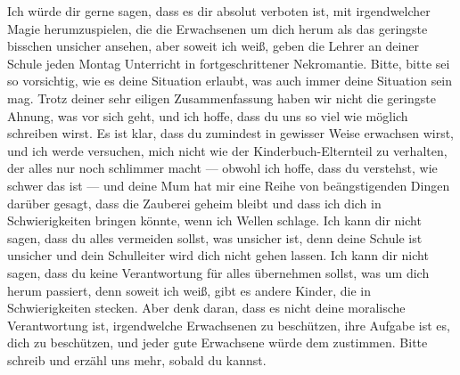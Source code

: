\begin{writtenNote}
Ich würde dir gerne sagen, dass es dir absolut verboten ist, mit irgendwelcher Magie herumzuspielen, die die Erwachsenen um dich herum als das geringste bisschen unsicher ansehen, aber soweit ich weiß, geben die Lehrer an deiner Schule jeden Montag Unterricht in fortgeschrittener Nekromantie. Bitte, bitte sei so vorsichtig, wie es deine Situation erlaubt, was auch immer deine Situation sein mag. Trotz deiner sehr eiligen Zusammenfassung haben wir nicht die geringste Ahnung, was vor sich geht, und ich hoffe, dass du uns so viel wie möglich schreiben wirst. Es ist klar, dass du zumindest in gewisser Weise erwachsen wirst, und ich werde versuchen, mich nicht wie der Kinderbuch-Elternteil zu verhalten, der alles nur noch schlimmer macht — obwohl ich hoffe, dass du verstehst, wie schwer das ist — und deine Mum hat mir eine Reihe von beängstigenden Dingen darüber gesagt, dass die Zauberei geheim bleibt und dass ich dich in Schwierigkeiten bringen könnte, wenn ich Wellen schlage. Ich kann dir nicht sagen, dass du alles vermeiden sollst, was unsicher ist, denn deine Schule ist unsicher und dein Schulleiter wird dich nicht gehen lassen. Ich kann dir nicht sagen, dass du keine Verantwortung für alles übernehmen sollst, was um dich herum passiert, denn soweit ich weiß, gibt es andere Kinder, die in Schwierigkeiten stecken. Aber denk daran, dass es nicht deine moralische Verantwortung ist, irgendwelche Erwachsenen zu beschützen, ihre Aufgabe ist es, dich zu beschützen, und jeder gute Erwachsene würde dem zustimmen. Bitte schreib und erzähl uns mehr, sobald du kannst.


\end{writtenNote}
